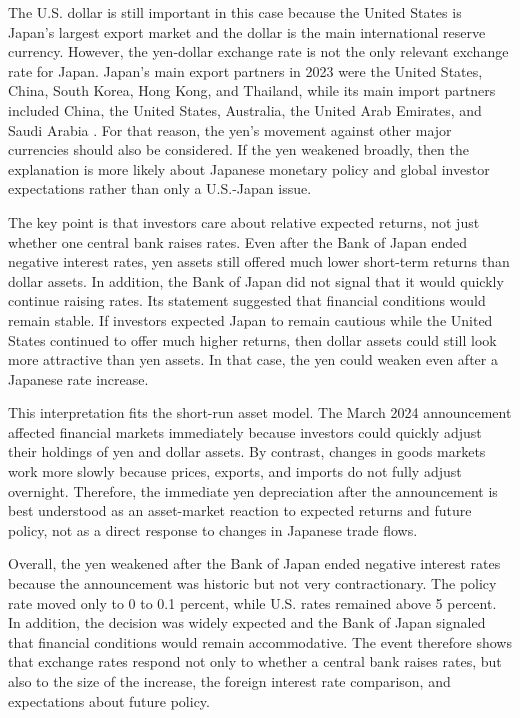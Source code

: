 \documentclass[12pt]{article}
\begin{document}
The U.S. dollar is still important in this case because the United States is Japan's largest export market and the dollar is the main international reserve currency. However, the yen-dollar exchange rate is not the only relevant exchange rate for Japan. Japan's main export partners in 2023 were the United States, China, South Korea, Hong Kong, and Thailand, while its main import partners included China, the United States, Australia, the United Arab Emirates, and Saudi Arabia \citep{santander2024japantrade}. For that reason, the yen's movement against other major currencies should also be considered. If the yen weakened broadly, then the explanation is more likely about Japanese monetary policy and global investor expectations rather than only a U.S.-Japan issue.

The key point is that investors care about relative expected returns, not just whether one central bank raises rates. Even after the Bank of Japan ended negative interest rates, yen assets still offered much lower short-term returns than dollar assets. In addition, the Bank of Japan did not signal that it would quickly continue raising rates. Its statement suggested that financial conditions would remain stable. If investors expected Japan to remain cautious while the United States continued to offer much higher returns, then dollar assets could still look more attractive than yen assets. In that case, the yen could weaken even after a Japanese rate increase.

This interpretation fits the short-run asset model. The March 2024 announcement affected financial markets immediately because investors could quickly adjust their holdings of yen and dollar assets. By contrast, changes in goods markets work more slowly because prices, exports, and imports do not fully adjust overnight. Therefore, the immediate yen depreciation after the announcement is best understood as an asset-market reaction to expected returns and future policy, not as a direct response to changes in Japanese trade flows.

Overall, the yen weakened after the Bank of Japan ended negative interest rates because the announcement was historic but not very contractionary. The policy rate moved only to 0 to 0.1 percent, while U.S. rates remained above 5 percent. In addition, the decision was widely expected and the Bank of Japan signaled that financial conditions would remain accommodative. The event therefore shows that exchange rates respond not only to whether a central bank raises rates, but also to the size of the increase, the foreign interest rate comparison, and expectations about future policy.
\end{document}
